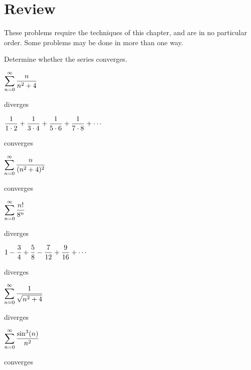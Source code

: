 \chapter*{Review}{}{}

These problems require the techniques of this chapter, and are in no
particular order. Some problems may be done in more than one way.

\begin{exercises}

Determine whether the series converges.

\begin{exercise} $\displaystyle\sum_{n=0}^\infty {n\over n^2+4}$
\begin{answer} diverges
\end{answer}\end{exercise}

\begin{exercise} $\displaystyle {1\over 1\cdot 2}+{1\over 3\cdot
  4}+{1\over 5\cdot 6}+{1\over 7\cdot 8}+\cdots$
\begin{answer} converges
\end{answer}\end{exercise}

\begin{exercise} $\displaystyle\sum_{n=0}^\infty {n\over (n^2+4)^2}$
\begin{answer} converges
\end{answer}\end{exercise}

\begin{exercise} $\displaystyle\sum_{n=0}^\infty {n!\over 8^n}$
\begin{answer} diverges
\end{answer}\end{exercise}

\begin{exercise} $\displaystyle 1-{3\over4}+{5\over8}-{7\over12}+{9\over16}+\cdots$
\begin{answer} diverges
\end{answer}\end{exercise}

\begin{exercise} $\displaystyle\sum_{n=0}^\infty {1\over \sqrt{n^2+4}}$
\begin{answer} diverges
\end{answer}\end{exercise}

\begin{exercise} $\displaystyle\sum_{n=0}^\infty {\sin^3(n)\over n^2}$
\begin{answer} converges
\end{answer}\end{exercise}


\end{exercises}
